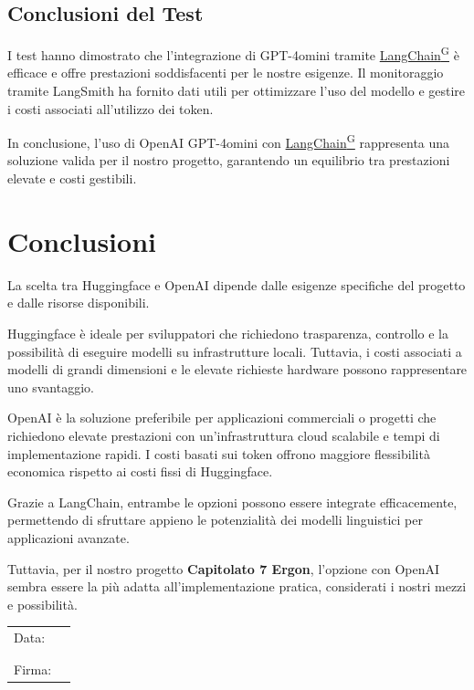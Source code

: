 \documentclass{article}
\begin{document}
\subsection{Conclusioni del Test}
I test hanno dimostrato che l'integrazione di GPT-4omini tramite \href{https://code7crusaders.github.io/docs/RTB/documentazione_interna/glossario.html#langchain}{LangChain\textsuperscript{G}} è efficace e offre prestazioni soddisfacenti per le nostre esigenze. Il monitoraggio tramite LangSmith ha fornito dati utili per ottimizzare l'uso del modello e gestire i costi associati all'utilizzo dei token.

In conclusione, l'uso di OpenAI GPT-4omini con \href{https://code7crusaders.github.io/docs/RTB/documentazione_interna/glossario.html#langchain}{LangChain\textsuperscript{G}} rappresenta una soluzione valida per il nostro progetto, garantendo un equilibrio tra prestazioni elevate e costi gestibili.

\section{Conclusioni}
La scelta tra Huggingface e OpenAI dipende dalle esigenze specifiche del progetto e dalle risorse disponibili.

Huggingface è ideale per sviluppatori che richiedono trasparenza, controllo e la possibilità di eseguire modelli su infrastrutture locali. Tuttavia, i costi associati a modelli di grandi dimensioni e le elevate richieste hardware possono rappresentare uno svantaggio.

OpenAI è la soluzione preferibile per applicazioni commerciali o progetti che richiedono elevate prestazioni con un'infrastruttura cloud scalabile e tempi di implementazione rapidi. I costi basati sui token offrono maggiore flessibilità economica rispetto ai costi fissi di Huggingface.

Grazie a LangChain, entrambe le opzioni possono essere integrate efficacemente, permettendo di sfruttare appieno le potenzialità dei modelli linguistici per applicazioni avanzate. 

Tuttavia, per il nostro progetto \textbf{Capitolato 7 Ergon}, l'opzione con OpenAI sembra essere la più adatta all'implementazione pratica, considerati i nostri mezzi e possibilità.

\begin{table}[b]
    \begin{tabular}{@{}p{.5in}p{4in}@{}}
        Data:  & \hrulefill \\
               &     		\\
               &     		\\
        Firma: & \hrulefill \\
    \end{tabular}
    \end{table}
\end{document}
